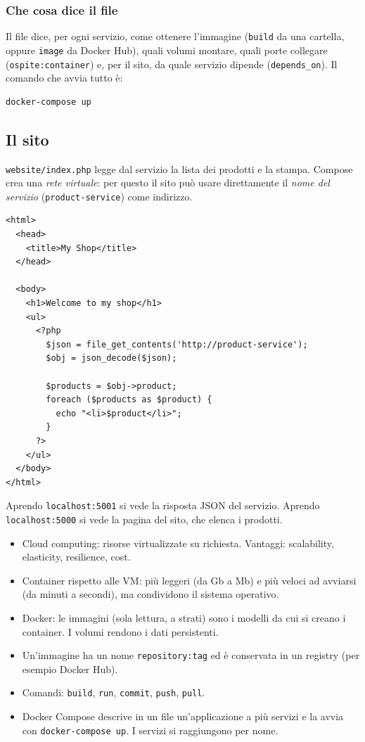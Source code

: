 \subsubsection{Che cosa dice il file\aggiunta}
Il file dice, per ogni servizio, come ottenere l'immagine (\texttt{build} da una cartella, oppure \texttt{image} da
Docker Hub), quali volumi montare, quali porte collegare (\texttt{ospite:container}) e, per il sito, da quale
servizio dipende (\texttt{depends\_on}). Il comando che avvia tutto è:

{\small
\begin{verbatim}
docker-compose up
\end{verbatim}
}

\subsection{Il sito}

\texttt{website/index.php} legge dal servizio la lista dei prodotti e la stampa. Compose crea una \emph{rete
virtuale}: per questo il sito può usare direttamente il \emph{nome del servizio} (\texttt{product-service}) come
indirizzo.

{\small
\begin{verbatim}
<html>
  <head>
    <title>My Shop</title>
  </head>

  <body>
    <h1>Welcome to my shop</h1>
    <ul>
      <?php
        $json = file_get_contents('http://product-service');
        $obj = json_decode($json);

        $products = $obj->product;
        foreach ($products as $product) {
          echo "<li>$product</li>";
        }
      ?>
    </ul>
  </body>
</html>
\end{verbatim}
}

Aprendo \texttt{localhost:5001} si vede la risposta JSON del servizio. Aprendo \texttt{localhost:5000} si vede la pagina
del sito, che elenca i prodotti.

\begin{puntichiave}
\begin{itemize}
  \item Cloud computing: risorse virtualizzate su richiesta. Vantaggi: scalability, elasticity, resilience, cost.
  \item Container rispetto alle VM: più leggeri (da Gb a Mb) e più veloci ad avviarsi (da minuti a secondi), ma
    condividono il sistema operativo.
  \item Docker: le immagini (sola lettura, a strati) sono i modelli da cui si creano i container. I volumi rendono
    i dati persistenti.
  \item Un'immagine ha un nome \texttt{repository:tag} ed è conservata in un registry (per esempio Docker Hub).
  \item Comandi: \texttt{build}, \texttt{run}, \texttt{commit}, \texttt{push}, \texttt{pull}.
  \item Docker Compose descrive in un file un'applicazione a più servizi e la avvia con \texttt{docker-compose up}.
    I servizi si raggiungono per nome.
\end{itemize}
\end{puntichiave}

